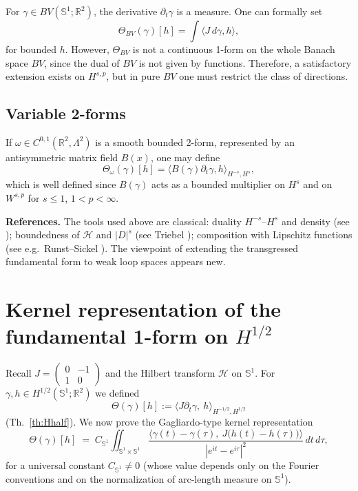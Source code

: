 \documentclass{amsart}
\newcounter{ex}
\newcounter{re}
\begin{document}
For $\gamma\in BV(\mathbb S^1;\mathbb R^2)$, the derivative
$\partial_t\gamma$ is a measure. One can formally set
\[
\Theta_{BV}(\gamma)[h]=\int \langle J\,d\gamma,h\rangle,
\]
for bounded $h$. However, $\Theta_{BV}$ is not a continuous 1-form on the whole
Banach space $BV$, since the dual of $BV$ is not given by functions.
Therefore, a satisfactory extension exists on $H^{s,p}$, but in pure $BV$
one must restrict the class of directions.

\subsection{Variable 2-forms}

If $\omega\in C^{0,1}(\mathbb R^2,\Lambda^2)$ is a smooth bounded 2-form,
represented by an antisymmetric matrix field $B(x)$, one may define
\[
\Theta_\omega(\gamma)[h]=\langle B(\gamma)\partial_t\gamma,h\rangle_{H^{-s},H^s},
\]
which is well defined since $B(\gamma)$ acts as a bounded multiplier on $H^{s}$
and on $W^{s,p}$ for $s\le1$, $1<p<\infty$.
\medskip

\noindent\textbf{References.} The tools used above are classical:
duality $H^{-s}$–$H^s$ and density (see \cite{BM1,BM2}); boundedness of
$\mathcal H$ and $|D|^s$ (see Triebel \cite{Triebel}); composition with Lipschitz
functions (see e.g.\ Runst–Sickel \cite{RunstSickel}). 
The viewpoint of extending the transgressed fundamental form to weak loop
spaces appears new.
\medskip



\section{Kernel representation of the fundamental 1-form on $H^{1/2}$}

Recall $J=\left( \begin{array}{cc}0&-1\\1&0 \end{array} \right)$ and the Hilbert transform
$\mathcal H$ on $\mathbb S^1$. For $\gamma,h\in H^{1/2}(\mathbb S^1;\mathbb R^2)$ we defined
\[
\Theta(\gamma)[h]:=\langle J\partial_t\gamma,\ h\rangle_{H^{-1/2},H^{1/2}}
\]
(Th.~\ref{th:Hhalf}). We now prove the Gagliardo-type kernel representation
\begin{equation}\label{eq:Theta-kernel}
\Theta(\gamma)[h]
\;=\; C_{\mathbb S^1}\iint_{\mathbb S^1\times\mathbb S^1}
\frac{\big\langle \gamma(t)-\gamma(\tau),\ J\big(h(t)-h(\tau)\big)\big\rangle}{|e^{it}-e^{i\tau}|^{2}}
\,dt\,d\tau,
\end{equation}
for a universal constant $C_{\mathbb S^1}\neq 0$ (whose value depends only on the
Fourier conventions and on the normalization of arc-length measure on $\mathbb S^1$).
\end{document}
